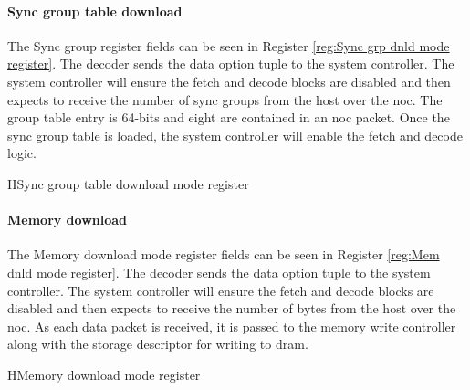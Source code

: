 \paragraph{Sync group table download}

The Sync group register fields can be seen in Register \ref{reg:Sync grp dnld mode register}.
The decoder sends the data option tuple to the system controller.
The system controller will ensure the fetch and decode blocks are disabled and then expects to receive the number of sync groups from the host over the \ac{noc}.
The group table entry is 64-bits and eight are contained in an \ac{noc} packet.
Once the sync group table is loaded, the system controller will enable the fetch and decode logic.
\begin{register}{H}{Sync group table download mode register}{}%
  \label{reg:Sync grp dnld mode register}
  \vspace{-10pt}
\end{register}

\paragraph{Memory download}
\label{sec:Memory download reg}

The Memory download mode register fields can be seen in Register \ref{reg:Mem dnld mode register}.
The decoder sends the data option tuple to the system controller.
The system controller will ensure the fetch and decode blocks are disabled and then expects to receive the number of bytes from the host over the \ac{noc}.
As each data packet is received, it is passed to the memory write controller along with the storage descriptor for writing to \ac{dram}.
\begin{register}{H}{Memory download mode register}{}%
  \label{reg:Mem dnld mode register}
  \vspace{-10pt}
\end{register}


